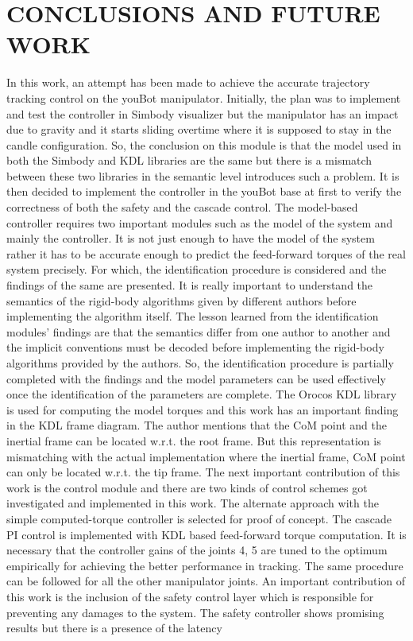 \chapter{CONCLUSIONS AND FUTURE WORK}
\label{sec:conclusion}

In this work, an attempt has been made to achieve the accurate trajectory tracking control on the youBot manipulator. Initially, the plan was to implement and test the controller in Simbody visualizer but the manipulator has an impact due to gravity and it starts sliding overtime where it is supposed to stay in the candle configuration. So, the conclusion on this module is that the model used in both the Simbody and KDL libraries are the same but there is a mismatch between these two libraries in the semantic level introduces such a problem. It is then decided to implement the controller in the youBot base at first to verify the correctness of both the safety and the cascade control. The model-based controller requires two important modules such as the model of the system and mainly the controller. It is not just enough to have the model of the system rather it has to be accurate enough to predict the feed-forward torques of the real system precisely. For which, the identification procedure is considered and the findings of the same are presented. It is really important to understand the semantics of the rigid-body algorithms given by different authors before implementing the algorithm itself. The lesson learned from the identification modules' findings are that the semantics differ from one author to another and the implicit conventions must be decoded before implementing the rigid-body algorithms provided by the authors. So, the identification procedure is partially completed with the findings and the model parameters can be used effectively once the identification of the parameters are  complete. The Orocos KDL library is used for computing the model torques and this work has an important finding in the KDL frame diagram. The author mentions that the CoM point and the inertial frame can be located w.r.t. the root frame. But this representation is mismatching with the actual implementation where the inertial frame, CoM point can only be located w.r.t. the tip frame. The next important contribution of this work is the control module and there are two kinds of control schemes got investigated and implemented in this work. The alternate approach with the simple computed-torque controller is selected for proof of concept. The cascade PI control is implemented with KDL based feed-forward torque computation. It is necessary that the controller gains of the joints 4, 5 are tuned to the optimum empirically for achieving the better performance in tracking. The same procedure can be followed for all the other manipulator joints. An important contribution of this work is the inclusion of the safety control layer which is responsible for preventing any damages to the system. The safety controller shows promising results but there is a presence of the latency 